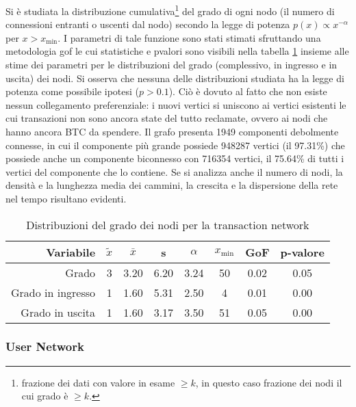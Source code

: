 Si è studiata la distribuzione cumulativa\footnote{frazione dei dati con valore in esame $\geq k$, in questo caso frazione dei nodi il cui grado è $\geq k$.} del grado di ogni nodo (il numero di connessioni entranti o uscenti dal nodo) secondo la legge di potenza $p(x)\propto x^{-\alpha}$ per $x > x_\text{min}$. I parametri di tale funzione sono stati stimati sfruttando una metodologia \gls{gof} le cui statistiche e \gls{pvalori} sono visibili nella tabella \ref{table:goftransactions} insieme alle stime dei parametri per le distribuzioni del grado (complessivo, in ingresso e in uscita) dei nodi. Si osserva che nessuna delle distribuzioni studiata ha la legge di potenza come possibile ipotesi ($p > 0.1$). Ciò è dovuto al fatto che non esiste nessun collegamento preferenziale: i nuovi vertici si uniscono ai vertici esistenti le cui transazioni non sono ancora state del tutto reclamate, ovvero ai nodi che hanno ancora BTC da spendere.
Il grafo presenta 1949 componenti debolmente connesse, in cui il componente più grande possiede 948287 vertici (il 97.31\%) che possiede anche un componente biconnesso con 716354 vertici, il 75.64\% di tutti i vertici del componente che lo contiene.
Se si analizza anche il numero di nodi, la densità e la lunghezza media dei cammini, la crescita e la dispersione della rete nel tempo risultano evidenti. %



\begin{table}
\centering
\label{table:goftransactions}
\caption{Distribuzioni del grado dei nodi per la transaction network}
\begin{tabular}{r | c c c c c c c}
\textbf{Variabile} & \textbf{$\tilde{x}$} & \textbf{$\bar{x}$} & \textbf{s} & \textbf{$\alpha$} & \textbf{$x_\text{min}$} & \textbf{GoF} & \textbf{p-valore} \\
\hline
Grado & 3 & 3.20 & 6.20 & 3.24 & 50 & 0.02 & 0.05 \\
Grado in ingresso & 1 & 1.60 & 5.31 & 2.50 & 4 & 0.01 & 0.00 \\
Grado in uscita & 1 & 1.60 & 3.17 & 3.50 & 51 & 0.05 & 0.00 \\
\end{tabular}
\end{table}

\subsubsection{User Network}

